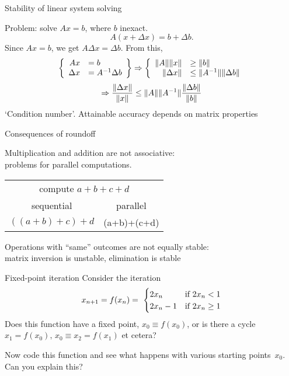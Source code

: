 \begin{numberedframe}{Stability of linear system solving}

Problem: solve $Ax=b$, where $b$ inexact.
\[ A(x+\Delta x)=b+\Delta b. \]
Since $Ax=b$, we get $A\Delta x=\Delta b$. From this,
\[
 \left \{
\begin{array}{rl}
  Ax&=b\\ \Delta x&=A^{-1} \Delta b\\ 
\end{array} \right\} \Rightarrow \left\{
\begin{array}{rl}
  \|A\| \|x\|&\geq\|b\| \\ \|\Delta x\|&\leq \|A^{-1}\| \|\Delta b\|
\end{array} \right.
\]
\[
\Rightarrow
\frac{\|\Delta x\|}{\|x\|}
\leq 
\|A\| \|A^{-1}\| \frac{\|\Delta b\|}{\|b\|}
\]
`Condition number'. Attainable accuracy depends on matrix properties
\end{numberedframe}

\begin{numberedframe}{Consequences of roundoff}

Multiplication and addition are not associative:\\
problems for parallel computations.

\begin{tabular}{|c|c|}
  \midrule
  \multicolumn{2}{|c|}{compute $a+b+c+d$}\\
  sequential&parallel\\
  \midrule
  $((a+b)+c)+d$&(a+b)+(c+d)\\
  \midrule
\end{tabular}

Operations with ``same'' outcomes are not equally stable:\\
matrix inversion is unstable, elimination is stable
\end{numberedframe}

\begin{exercise}{Fixed-point iteration}
  Consider the iteration
  \[ x_{n+1}=f(x_n) = \
  \begin{cases}
    2x_n&\hbox{if $2x_n<1$}\\
    2x_n-1&\hbox{if $2x_n\geq 1$}\\
  \end{cases}
  \]
  Does this function have a fixed point, $x_0\equiv f(x_0)$, or is there a cycle
  $x_1=f(x_0),\,x_0\equiv x_2=f(x_1)$ et cetera?

  Now code this function and see what happens with various starting
  points~$x_0$. Can you explain this?
\end{exercise}

